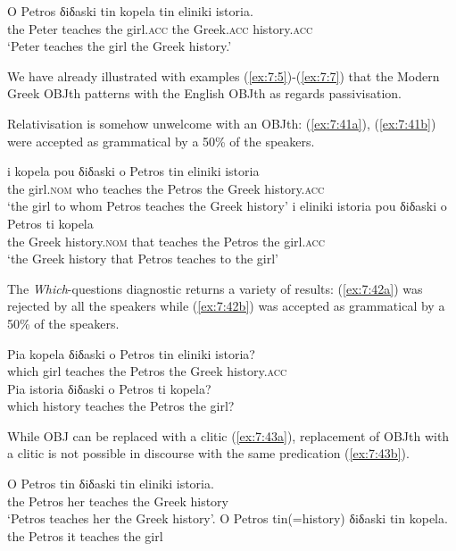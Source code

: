 \documentclass[output=paper]{langsci/langscibook}
\begin{document}
\ea%
    \label{ex:7:40}
\gll O Petros δiδaski tin kopela tin eliniki istoria.\\
     the Peter  teaches the girl.\textsc{acc} the Greek.\textsc{acc} history.\textsc{acc}\\
\glt `Peter teaches the girl the Greek history.'
\z

We have already illustrated with examples (\ref{ex:7:5})-(\ref{ex:7:7}) that the Modern Greek OBJth patterns with the English  OBJth as regards passivisation. 

Relativisation is somehow unwelcome with an OBJth: (\ref{ex:7:41a}), (\ref{ex:7:41b}) were accepted as grammatical by a 50\% of the speakers.

\ea%
\label{ex:7:41}
\ea \label{ex:7:41a}
\gll i kopela pou δiδaski o Petros tin eliniki istoria\\
     the girl.\textsc{nom}  who teaches the Petros the Greek history.\textsc{acc}\\
\glt `the girl to whom Petros teaches the Greek history'
\ex \label{ex:7:41b}
\gll i eliniki istoria pou δiδaski o Petros ti kopela\\
     the Greek history.\textsc{nom} that teaches the Petros the  girl.\textsc{acc}\\
\glt `the Greek history that Petros teaches to the girl'
\z
\z

The \textit{Which}-questions diagnostic returns a variety of results: (\ref{ex:7:42a}) was rejected by all the speakers while (\ref{ex:7:42b}) was accepted as grammatical by a 50\% of the speakers.

\ea%
\label{ex:7:42}
\ea \label{ex:7:42a}
\gll           *Pia kopela δiδaski o Petros tin eliniki istoria?\\
                which girl teaches the Petros the Greek history.\textsc{acc}\\
\ex \label{ex:7:42b}
\gll Pia istoria  δiδaski o Petros ti kopela?\\
               which history teaches the Petros the girl?\\
\z
\z

While OBJ can be replaced with a clitic (\ref{ex:7:43a}), replacement of OBJth with a clitic is not possible in discourse with the same predication (\ref{ex:7:43b}).

\ea%
\label{ex:7:43}
\ea \label{ex:7:43a}
\gll O Petros tin δiδaski tin eliniki istoria.\\
                the Petros her teaches the Greek history\\
\glt            `Petros teaches her the Greek history'.
\ex \label{ex:7:43b}
\gll *O Petros tin(=history) δiδaski tin kopela.\\
                  the Petros it teaches the girl\\
\z
\z
\end{document}
